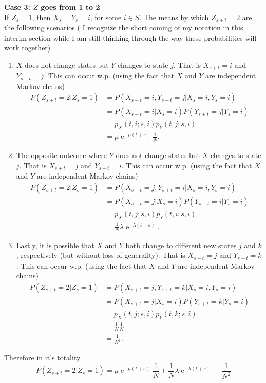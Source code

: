 \documentclass[10pt]{amsart}
\DeclareMathOperator{\E}{e}
\begin{document}
\noindent
\textbf{Case 3: $Z$ goes from 1 to 2} \\
If $Z_s = 1$, then $X_s = Y_s = i$, for some $i \in S$.
The means by which $Z_{s + t} = 2$ are the following scenarios ( I recognize the short coming of my notation in this interim section while I am still thinking through the way these probabilities will work together)
\begin{enumerate}
\item $X$ does not change states but $Y$ changes to state $j$.
That is $X_{s + t} = i$ and $Y_{s + t} = j$.
This can occur w.p. (using the fact that $X$ and $Y$ are independent Markov chains)
\begin{align*}
P(Z_{s + t} = 2 | Z_s = 1)
	&= P(X_{s + t} = i,Y_{s + t} = j | X_s = i,Y_s = i) \\
	&= P(X_{s + t} = i| X_s = i)P(Y_{s + t} = j | Y_s = i) \\
	&= p_X(t,i;s,i) p_Y(t,j;s,i) \\
	&= \mu\E^{-\mu(t + s)} \frac 1 N.
\end{align*}
\item The opposite outcome where $Y$ does not change states but $X$ changes to state $j$.
That is $X_{s + t} = j$ and $Y_{s + t} = i$.
This can occur w.p. (using the fact that $X$ and $Y$ are independent Markov chains)
\begin{align*}
P(Z_{s + t} = 2 | Z_s = 1)
	&= P(X_{s + t} = j,Y_{s + t} = i | X_s = i,Y_s = i) \\
	&= P(X_{s + t} = j| X_s = i)P(Y_{s + t} = i | Y_s = i) \\
	&= p_X(t,j;s,i)p_Y(t,i;s,i) \\
	&= \frac 1 N \lambda\E^{-\lambda(t + s)}.
\end{align*}
\item Lastly, it is possible that $X$ and $Y$ both change to different new states $j$ and $k$, respectively (but without loss of generality).
That is $X_{s + t} = j$ and $Y_{s + t} = k$.
This can occur w.p. (using the fact that $X$ and $Y$ are independent Markov chains)
\begin{align*}
P(Z_{s + t} = 2 | Z_s = 1)
	&= P(X_{s + t} = j,Y_{s + t} = k | X_s = i,Y_s = i) \\
	&= P(X_{s + t} = j| X_s = i)P(Y_{s + t} = k | Y_s = i) \\
	&= p_X(t,j;s,i)p_Y(t,k;s,i) \\
	&= \frac 1 N \frac 1 N \\
	&= \frac 1 {N^2}.
\end{align*}
\end{enumerate}
Therefore in it's totality
$$
P(Z_{s + t} = 2 | Z_s = 1) = \mu\E^{-\mu(t + s)} \frac 1 N + \frac 1 N  \lambda\E^{-\lambda(t + s)} + \frac 1 {N^2}
$$
\end{document}

